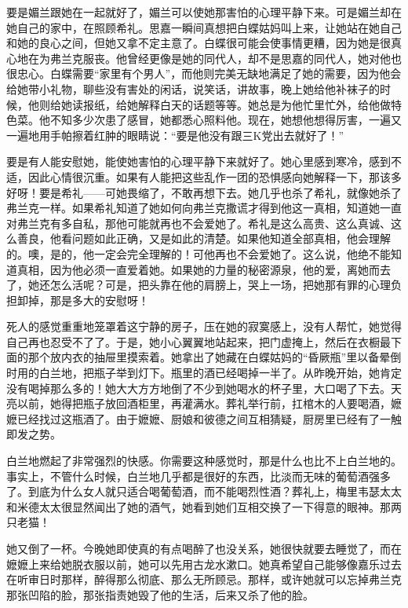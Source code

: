 \par 要是媚兰跟她在一起就好了，媚兰可以使她那害怕的心理平静下来。可是媚兰却在她自己的家中，在照顾希礼。思嘉一瞬间真想把白蝶姑妈叫上来，让她站在她自己和她的良心之间，但她又拿不定主意了。白蝶很可能会使事情更糟，因为她是很真心地在为弗兰克服丧。他曾经更像是她的同代人，却不是思嘉的同代人，她对他也很忠心。白蝶需要“家里有个男人”，而他则完美无缺地满足了她的需要，因为他会给她带小礼物，聊些没有害处的闲话，说笑话，讲故事，晚上她给他补袜子的时候，他则给她读报纸，给她解释白天的话题等等。她总是为他忙里忙外，给他做特色菜。他不知多少次患了感冒，她都悉心照料他。现在，她想他想得厉害，一遍又一遍地用手帕擦着红肿的眼睛说：“要是他没有跟三K党出去就好了！”
\par 要是有人能安慰她，能使她害怕的心理平静下来就好了。她心里感到寒冷，感到不适，因此心情很沉重。如果有人能把这些乱作一团的恐惧感向她解释一下，那该多好呀！要是希礼——可她畏缩了，不敢再想下去。她几乎也杀了希礼，就像她杀了弗兰克一样。如果希礼知道了她如何向弗兰克撒谎才得到他这一真相，知道她一直对弗兰克有多自私，那他可能就再也不会爱她了。希礼是这么高贵、这么真诚、这么善良，他看问题如此正确，又是如此的清楚。如果他知道全部真相，他会理解的。噢，是的，他一定会完全理解的！可他再也不会爱她了。这么说，他绝不能知道真相，因为他必须一直爱着她。如果她的力量的秘密源泉，他的爱，离她而去了，她还怎么活呢？可是，把头靠在他的肩膀上，哭上一场，把她那有罪的心理负担卸掉，那是多大的安慰呀！
\par 死人的感觉重重地笼罩着这宁静的房子，压在她的寂寞感上，没有人帮忙，她觉得自己再也忍受不了了。于是，她小心翼翼地站起来，把门虚掩上，然后在衣橱最下面的那个放内衣的抽屉里摸索着。她拿出了她藏在白蝶姑妈的“昏厥瓶”里以备晕倒时用的白兰地，把瓶子举到灯下。瓶里的酒已经喝掉一半了。从昨晚开始，她肯定没有喝掉那么多的！她大大方方地倒了不少到她喝水的杯子里，大口喝了下去。天亮以前，她得把瓶子放回酒柜里，再灌满水。葬礼举行前，扛棺木的人要喝酒，嬷嬷已经找过这瓶酒了。由于嬷嬷、厨娘和彼德之间互相猜疑，厨房里已经有了一触即发之势。
\par 白兰地燃起了非常强烈的快感。你需要这种感觉时，那是什么也比不上白兰地的。事实上，不管什么时候，白兰地几乎都是很好的东西，比淡而无味的葡萄酒强多了。到底为什么女人就只适合喝葡萄酒，而不能喝烈性酒？葬礼上，梅里韦瑟太太和米德太太很显然闻出了她的酒气，她看到她们互相交换了一下得意的眼神。那两只老猫！
\par 她又倒了一杯。今晚她即使真的有点喝醉了也没关系，她很快就要去睡觉了，而在嬷嬷上来给她脱衣服以前，她可以先用古龙水漱口。她真希望自己能够像嘉乐过去在听审日时那样，醉得那么彻底、那么无所顾忌。那样，或许她就可以忘掉弗兰克那张凹陷的脸，那张指责她毁了他的生活，后来又杀了他的脸。
